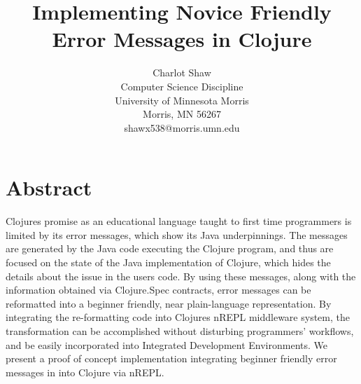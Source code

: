 \documentclass[12pt]{article}
\newcommand{\comment}[1]{{\bf \tt  {#1}}}
\begin{document}
\pagestyle{plain}
%

\title{Implementing Novice Friendly Error Messages in Clojure}
%
%

\author{
Charlot Shaw \\
Computer Science Discipline \\
University of Minnesota Morris\\
Morris, MN 56267\\
shawx538@morris.umn.edu
}
\maketitle
\thispagestyle{empty}

\section*{\centering Abstract}
Clojures promise as an educational language taught to first time programmers is
limited by its error messages, which show its Java underpinnings. The messages
are generated by the Java code executing the Clojure program, and thus are
focused on the state of the Java implementation of Clojure,
which hides the details about the issue in the users code.
By using these messages, along with the information obtained via Clojure.Spec contracts,
 error messages can be reformatted into a beginner friendly, near plain-language representation.
 By integrating the re-formatting code into Clojures nREPL middleware system, the
 transformation can be accomplished without disturbing programmers' workflows, and be easily
 incorporated into Integrated Development Environments.
We present a proof of concept implementation
integrating beginner friendly error messages in into Clojure via nREPL.
\end{document}
